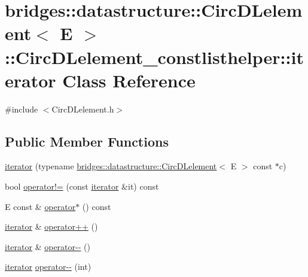 \hypertarget{classbridges_1_1datastructure_1_1_circ_d_lelement_1_1_circ_d_lelement__constlisthelper_1_1iterator}{}\section{bridges\+:\+:datastructure\+:\+:Circ\+D\+Lelement$<$ E $>$\+:\+:Circ\+D\+Lelement\+\_\+constlisthelper\+:\+:iterator Class Reference}
\label{classbridges_1_1datastructure_1_1_circ_d_lelement_1_1_circ_d_lelement__constlisthelper_1_1iterator}


{\ttfamily \#include $<$Circ\+D\+Lelement.\+h$>$}

\subsection*{Public Member Functions}
\begin{DoxyCompactItemize}
\item 
\hyperlink{classbridges_1_1datastructure_1_1_circ_d_lelement_1_1_circ_d_lelement__constlisthelper_1_1iterator_afa1a1c95cab43f85ff80604477a7ccaf}{iterator} (typename \hyperlink{classbridges_1_1datastructure_1_1_circ_d_lelement}{bridges\+::datastructure\+::\+Circ\+D\+Lelement}$<$ E $>$ const $\ast$c)
\item 
bool \hyperlink{classbridges_1_1datastructure_1_1_circ_d_lelement_1_1_circ_d_lelement__constlisthelper_1_1iterator_aa7db6d0608ee22573e88b8a8cd556944}{operator!=} (const \hyperlink{classbridges_1_1datastructure_1_1_circ_d_lelement_1_1_circ_d_lelement__constlisthelper_1_1iterator}{iterator} \&it) const
\item 
E const  \& \hyperlink{classbridges_1_1datastructure_1_1_circ_d_lelement_1_1_circ_d_lelement__constlisthelper_1_1iterator_ac91b634063ff794002527dcc8441e49e}{operator$\ast$} () const
\item 
\hyperlink{classbridges_1_1datastructure_1_1_circ_d_lelement_1_1_circ_d_lelement__constlisthelper_1_1iterator}{iterator} \& \hyperlink{classbridges_1_1datastructure_1_1_circ_d_lelement_1_1_circ_d_lelement__constlisthelper_1_1iterator_a76c8600c8f12eb8e329044e812e9b417}{operator++} ()
\item 
\hyperlink{classbridges_1_1datastructure_1_1_circ_d_lelement_1_1_circ_d_lelement__constlisthelper_1_1iterator}{iterator} \& \hyperlink{classbridges_1_1datastructure_1_1_circ_d_lelement_1_1_circ_d_lelement__constlisthelper_1_1iterator_a794e8d3566e860bf4c274d67b926c4a3}{operator-\/-\/} ()
\item 
\hyperlink{classbridges_1_1datastructure_1_1_circ_d_lelement_1_1_circ_d_lelement__constlisthelper_1_1iterator}{iterator} \hyperlink{classbridges_1_1datastructure_1_1_circ_d_lelement_1_1_circ_d_lelement__constlisthelper_1_1iterator_a1f40545d68c46c28ab56447cd97c1924}{operator-\/-\/} (int)
\end{DoxyCompactItemize}


